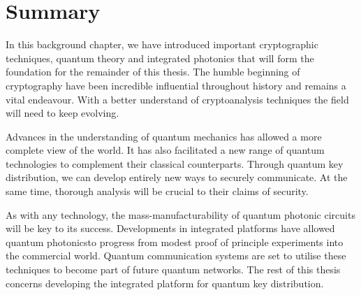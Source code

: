 
\section{Summary}

In this background chapter, we have introduced important cryptographic techniques, quantum theory and integrated photonics that will form the foundation for the remainder of this thesis. The humble beginning of cryptography have been incredible influential throughout history and remains a vital endeavour. With a better understand of cryptoanalysis techniques the field will need to keep evolving.

Advances in the understanding of quantum mechanics has allowed a more complete view of the world. It has also facilitated a new range of quantum technologies to complement their classical counterparts. Through quantum key distribution, we can develop entirely new ways to securely communicate. At the same time, thorough analysis will be crucial to their claims of security.

As with any technology, the mass-manufacturability of quantum photonic circuits will be key to its success. Developments in integrated platforms have allowed quantum photonicsto progress from modest proof of principle experiments into the commercial world. Quantum communication systems are set to utilise these techniques to become part of future quantum networks. The rest of this thesis concerns developing the integrated platform for quantum key distribution.

